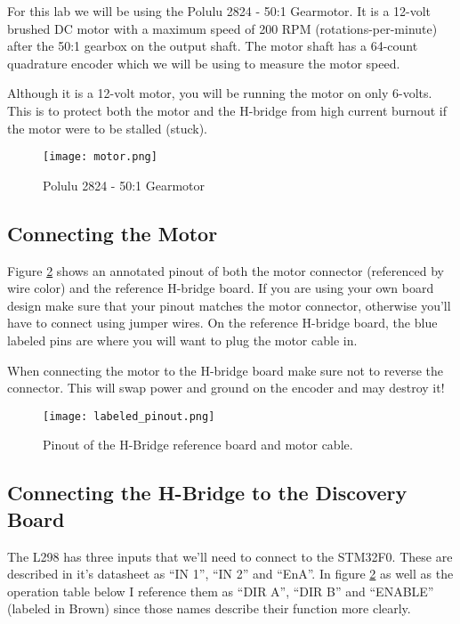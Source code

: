 \documentclass[openany,11pt,fleqn]{book} %
\begin{document}
For this lab we will be using the Polulu 2824 - 50:1 Gearmotor. It is a 12-volt brushed DC motor with a maximum speed of 200 RPM (rotations-per-minute) after the 50:1 gearbox on the output shaft. The motor shaft has a 64-count quadrature encoder which we will be using to measure the motor speed. 

Although it is a 12-volt motor, you will be running the motor on only 6-volts. This is to protect both the motor and the H-bridge from high current burnout if the motor were to be stalled (stuck).


\begin{figure}[tb]
    \centering\texttt{[image: motor.png]}
    \caption{Polulu 2824 - 50:1 Gearmotor}
    \label{motor}
\end{figure}

\subsection{Connecting the Motor}
Figure \ref{labeled_pinout} shows an annotated pinout of both the motor connector (referenced by wire color) and the reference H-bridge board. If you are using your own board design make sure that your pinout matches the motor connector, otherwise you'll have to connect using jumper wires. On the reference H-bridge board, the blue labeled pins are where you will want to plug the motor cable in.

\begin{warning}
    When connecting the motor to the H-bridge board make sure not to reverse the connector. This will swap power and ground on the encoder and may destroy it!
\end{warning}

\begin{figure}[t]
    \begin{center}
        \hspace*{-3.4cm}
        \texttt{[image: labeled\_pinout.png]}
        \caption{Pinout of the H-Bridge reference board and motor cable.}
        \label{labeled_pinout}
    \end{center}
\end{figure}


\subsection{Connecting the H-Bridge to the Discovery Board}
The L298 has three inputs that we'll need to connect to the STM32F0. These are described in it's datasheet as ``IN 1'', ``IN 2'' and ``EnA''. In figure \ref{labeled_pinout}  as well as the operation table below I reference them as ``DIR A'', ``DIR B'' and ``ENABLE'' (labeled in Brown) since those names describe their function more clearly.
\end{document}
